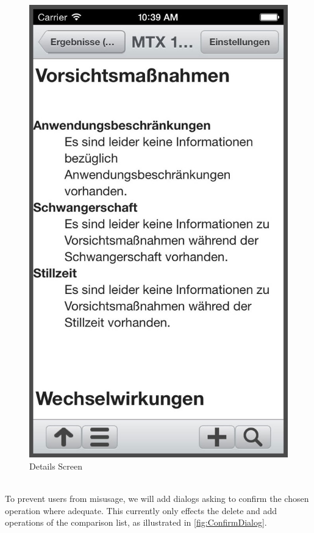 \begin{figure}[!ptb]
\begin{minipage}[b]{0.45\linewidth}
        \includegraphics[width=0.8025\linewidth]{figures/Detail_bw.jpg}
        \caption[Pharmaceutical Details Screen]{Details Screen}
        \label{fig:DetailsScreen}
    \end{minipage}
\end{figure}
\\
To prevent users from misusage, we will add dialogs asking to confirm the chosen operation where adequate. This currently only effects the delete and add operations of the comparison list, as illustrated in \ref{fig:ConfirmDialog}.
\\
